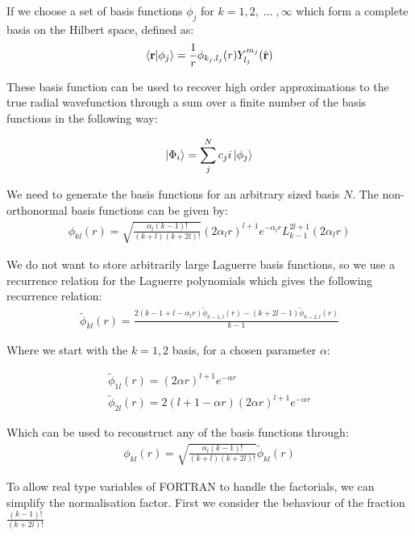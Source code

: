 \documentclass{article}
\renewcommand{\vec}[1]{\mathbf{#1}}
\let\oldhat\hat
\renewcommand{\hat}[1]{\oldhat{\mathbf{#1}}}
\begin{document}
    If we choose a set of basis functions $\phi_{j}$ for $k={1,2,\; ...\;, \infty}$ which form a complete basis on the Hilbert space, defined as:
    \large
    \begin{gather}
    	\braket{\vec{r}}{\phi_j} = \frac{1}{r}\phi_{k_j,l_j}(r)Y^{m_j}_{l_j}(\hat{\vec{r}})
    \end{gather}
    \normalsize
    
    These basis function can be used to recover high order approximations to the true radial wavefunction through a sum over a finite number of the basis functions in the following way:
   
    \large
    \begin{gather}
    	\ket{\Phi_i} = \sum_{j}^{N} c_ji \ket{\phi_j}
    \end{gather}
    \normalsize
    
    We need to generate the basis functions for an arbitrary sized basis $N$.
    The non-orthonormal basis functions can be given by:
    \begin{gather}
    	\phi_{kl}(r) = \sqrt{\frac{\alpha_l (k-1)!}{(k+l)(k+2l)!}}(2\alpha_l r)^{l+1} e^{-\alpha_l r} L^{2l+1}_{k-1}(2\alpha_l r)
    \end{gather}
    
    We do not want to store arbitrarily large Laguerre basis functions, so we use a recurrence relation for the Laguerre polynomials which gives the following recurrence relation:
    \begin{gather}
    	\tilde{\phi}_{kl}(r) = \frac{2(k-1+l-\alpha_lr)\tilde{\phi}_{k-1,l}(r) - (k+2l-1)\tilde{\phi}_{k-2,l}(r)}{k-1}
    \end{gather}
    
    Where we start with the $k=1,2$ basis, for a chosen parameter $\alpha$:
    
    \begin{gather}
    	\tilde{\phi}_{1l}(r) = (2\alpha r)^{l+1}e^{-\alpha r}\\
    	\tilde{\phi}_{2l}(r) = 2(l+1-\alpha r)(2\alpha r)^{l+1}e^{-\alpha r}
    \end{gather}
    
    Which can be used to reconstruct any of the basis functions through:
    \begin{gather}
    	\phi_{kl}(r) = \sqrt{\frac{\alpha_l (k-1)!}{(k+l)(k+2l)!}}\tilde{\phi}_{kl}(r)
    \end{gather}
    
    To allow real type variables of FORTRAN to handle the factorials, we can simplify the normalisation factor. First we consider the behaviour of the fraction
    $\frac{(k-1)!}{(k+2l)!}$
    
\end{document}
